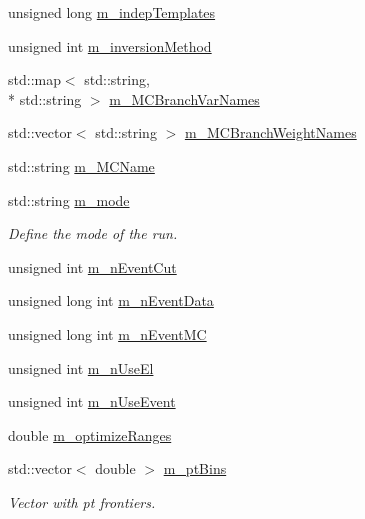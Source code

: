 \begin{DoxyCompactItemize}
\item 
unsigned long \hyperlink{classTemplateMethod_1_1Setting_afaeffdb355dfea78cda3000b236390b2}{m\+\_\+indep\+Templates}
\item 
unsigned int \hyperlink{classTemplateMethod_1_1Setting_a5fede24b6373944291962f14f4544531}{m\+\_\+inversion\+Method}
\item 
std\+::map$<$ std\+::string, \\*
std\+::string $>$ \hyperlink{classTemplateMethod_1_1Setting_a65f0c73f530b8afc310b45ac03fcdfbe}{m\+\_\+\+M\+C\+Branch\+Var\+Names}
\item 
std\+::vector$<$ std\+::string $>$ \hyperlink{classTemplateMethod_1_1Setting_ad9704c55181f47d313dee1ce7c89efb2}{m\+\_\+\+M\+C\+Branch\+Weight\+Names}
\item 
std\+::string \hyperlink{classTemplateMethod_1_1Setting_a67c9e8ae32516fe647540afa31dc74ce}{m\+\_\+\+M\+C\+Name}
\item 
std\+::string \hyperlink{classTemplateMethod_1_1Setting_af323868d7651bdfd2c34ea076cfaceb7}{m\+\_\+mode}
\begin{DoxyCompactList}\small\item\em Define the mode of the run. \end{DoxyCompactList}\item 
unsigned int \hyperlink{classTemplateMethod_1_1Setting_a10d90538c643f2da59ed5b6150e1089c}{m\+\_\+n\+Event\+Cut}
\item 
unsigned long int \hyperlink{classTemplateMethod_1_1Setting_afff544a4e01b547c38abe2f6db895ee1}{m\+\_\+n\+Event\+Data}
\item 
unsigned long int \hyperlink{classTemplateMethod_1_1Setting_a4785649ad4d624beb9514352a24b9c6f}{m\+\_\+n\+Event\+M\+C}
\item 
unsigned int \hyperlink{classTemplateMethod_1_1Setting_afe7029d9b4b8a892b03befc4e1271b34}{m\+\_\+n\+Use\+El}
\item 
unsigned int \hyperlink{classTemplateMethod_1_1Setting_ad5b209a6f625211ae0717d675c761445}{m\+\_\+n\+Use\+Event}
\item 
double \hyperlink{classTemplateMethod_1_1Setting_aa911a6d23a63351a3afd1a1954ef11a8}{m\+\_\+optimize\+Ranges}
\item 
std\+::vector$<$ double $>$ \hyperlink{classTemplateMethod_1_1Setting_a2d3f8eeaa8631c702f805e31c9fce9fd}{m\+\_\+pt\+Bins}
\begin{DoxyCompactList}\small\item\em Vector with pt frontiers. \end{DoxyCompactList}\item 

\end{DoxyCompactItemize}
